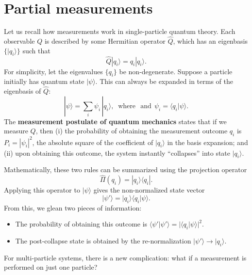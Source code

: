 \documentclass[pra,12pt]{revtex4-2}
\begin{document}
\section{Partial measurements}
\label{sec:partialmeasurements}

Let us recall how measurements work in single-particle quantum theory.
Each observable $Q$ is described by some Hermitian operator $\hat{Q}$,
which has an eigenbasis $\{|q_i\rangle\}$ such that
\begin{equation}
  \hat{Q}|q_i\rangle = q_i |q_i\rangle.
\end{equation}
For simplicity, let the eigenvalues $\{q_i\}$ be non-degenerate.
Suppose a particle initially has quantum state $|\psi\rangle$.  This
can always be expanded in terms of the eigenbasis of $\hat{Q}$:
\begin{equation}
  |\psi\rangle = \sum_i \psi_i\, |q_i\rangle, \;\;\mathrm{where}\;\;\,\textrm{and}\;\, \psi_i = \langle q_i|\psi\rangle.
\end{equation}
The \textbf{measurement postulate of quantum mechanics} states that if
we measure $Q$, then (i) the probability of obtaining the measurement
outcome $q_i$ is $P_i = |\psi_i|^2$, the absolute square of the
coefficient of $|q_i\rangle$ in the basis expansion; and (ii) upon
obtaining this outcome, the system instantly ``collapses'' into state
$|q_i\rangle$.

Mathematically, these two rules can be summarized using the projection
operator
\begin{equation}
  \hat{\Pi}(q_i) = |q_i\rangle\langle q_i|.
\end{equation}
Applying this operator to $|\psi\rangle$ gives the non-normalized
state vector
\begin{equation}
  |\psi'\rangle = |q_i\rangle \langle q_i|\psi\rangle.
\end{equation}
From this, we glean two pieces of information:
\begin{itemize}
\item The probability of obtaining this outcome is
  $\langle\psi'|\psi'\rangle = |\langle q_i|\psi\rangle|^2$.

\item The post-collapse state is obtained by the re-normalization
  $|\psi'\rangle \rightarrow |q_i\rangle$.
\end{itemize}

For multi-particle systems, there is a new complication: what if a
measurement is performed on just one particle?
\end{document}
